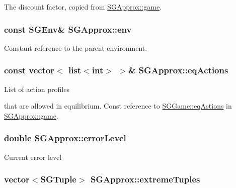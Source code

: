 The discount factor, copied from \hyperlink{classSGApprox_a0774e3ed0ff009809606a42c9e7ef727}{S\-G\-Approx\-::game}. \hypertarget{classSGApprox_a6597417918c1e6c764f4f943c72af781}{
\subsubsection[{env}]{\setlength{\rightskip}{0pt plus 5cm}const {\bf S\-G\-Env}\& S\-G\-Approx\-::env\hspace{0.3cm}{\ttfamily [private]}}}\label{classSGApprox_a6597417918c1e6c764f4f943c72af781}
Constant reference to the parent environment. \hypertarget{classSGApprox_ac737ccb3686428f766d9b69008dc897e}{
\subsubsection[{eq\-Actions}]{\setlength{\rightskip}{0pt plus 5cm}const vector$<$ list$<$int$>$ $>$\& S\-G\-Approx\-::eq\-Actions\hspace{0.3cm}{\ttfamily [private]}}}\label{classSGApprox_ac737ccb3686428f766d9b69008dc897e}
\begin{DoxyVerb}     List of action profiles
\end{DoxyVerb}
 that are allowed in equilibrium. Const reference to \hyperlink{classSGGame_a900ba2e4035c19b19dd5342219862347}{S\-G\-Game\-::eq\-Actions} in \hyperlink{classSGApprox_a0774e3ed0ff009809606a42c9e7ef727}{S\-G\-Approx\-::game}. \hypertarget{classSGApprox_aee816ed49535cfc211aa34d0e6064e01}{
\subsubsection[{error\-Level}]{\setlength{\rightskip}{0pt plus 5cm}double S\-G\-Approx\-::error\-Level\hspace{0.3cm}{\ttfamily [private]}}}\label{classSGApprox_aee816ed49535cfc211aa34d0e6064e01}
Current error level \hypertarget{classSGApprox_ab0e2c4678401f806922ac64667ad5ff6}{
\subsubsection[{extreme\-Tuples}]{\setlength{\rightskip}{0pt plus 5cm}vector$<${\bf S\-G\-Tuple}$>$ S\-G\-Approx\-::extreme\-Tuples\hspace{0.3cm}{\ttfamily [private]}}}\label{classSGApprox_ab0e2c4678401f806922ac64667ad5ff6}
